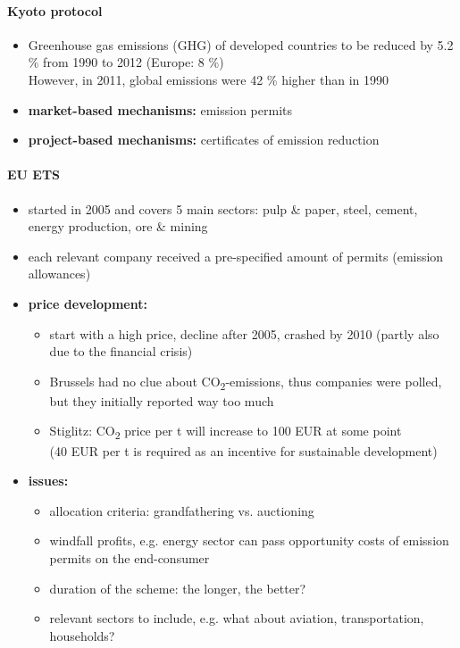 \documentclass[a4paper,landscape,8pt,fleqn]{scrartcl}
\renewcommand{\emph}[1]{\textbf{#1}}
\begin{document}
\begin{multicols*}{4}
\paragraph{Kyoto protocol}
\begin{itemize}
\item Greenhouse gas emissions (GHG) of developed countries to be reduced by 5.2 \% from 1990 to 2012 (Europe: 8 \%) \\
However, in 2011, global emissions were 42 \% higher than in 1990
\item \emph{market-based mechanisms:} emission permits
\item \emph{project-based mechanisms:} certificates of emission reduction
\end{itemize}

\paragraph{EU ETS}
\begin{itemize}
\item started in 2005 and covers 5 main sectors: pulp \& paper, steel, cement, energy production, ore \& mining
\item each relevant company received a pre-specified amount of permits (emission allowances)
\item \emph{price development:}
\begin{itemize}
\item start with a high price, decline after 2005, crashed by 2010 (partly also due to the financial crisis)
\item Brussels had no clue about CO\textsubscript{2}-emissions, thus companies were polled, but they initially reported way too much
\item Stiglitz: CO\textsubscript{2} price per t will increase to 100 EUR at some point \\
(40 EUR per t is required as an incentive for sustainable development)
\end{itemize}
\item \emph{issues:}
\begin{itemize}
\item allocation criteria: grandfathering vs. auctioning
\item windfall profits, e.g. energy sector can pass opportunity costs of emission permits on the end-consumer
\item duration of the scheme: the longer, the better?
\item relevant sectors to include, e.g. what about aviation, transportation, households?

\end{itemize}
\end{itemize}
\end{multicols*}
\end{document}
